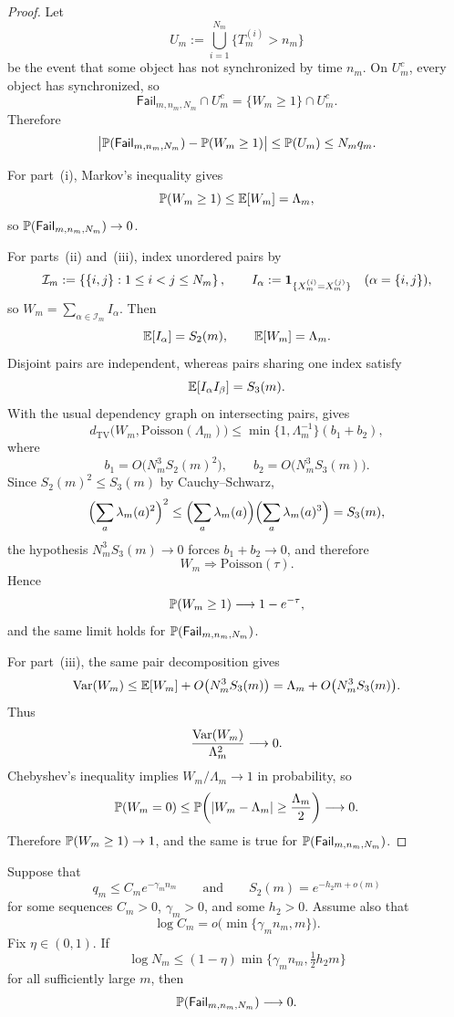 \begin{proof}
Let
\[
  U_m:=\bigcup_{i=1}^{N_m}\{T_m^{(i)}>n_m\}
\]
be the event that some object has not synchronized by time \(n_m\).
On \(U_m^c\), every object has synchronized, so
\[
  \mathsf{Fail}_{m,n_m,N_m}\cap U_m^c
  = \{W_m\geq 1\}\cap U_m^c.
\]
Therefore
\[
  \bigl|
    \mathbb{P}(\mathsf{Fail}_{m,n_m,N_m})
    - \mathbb{P}(W_m\geq 1)
  \bigr|
  \leq \mathbb{P}(U_m)
  \leq N_m q_m.
\]

For part~(i), Markov's inequality gives
\[
  \mathbb{P}(W_m\geq 1)\leq \mathbb{E}[W_m]=\Lambda_m,
\]
so \(\mathbb{P}(\mathsf{Fail}_{m,n_m,N_m})\to 0\).

For parts~(ii) and~(iii), index unordered pairs by
\[
  \mathcal{I}_m:=\left\{\{i,j\}:1\leq i<j\leq N_m\right\},
  \qquad
  I_\alpha:=\mathbf{1}_{\{X_m^{(i)}=X_m^{(j)}\}}
  \quad (\alpha=\{i,j\}),
\]
so \(W_m=\sum_{\alpha\in\mathcal{I}_m}I_\alpha\).  Then
\[
  \mathbb{E}[I_\alpha]=S_2(m),
  \qquad
  \mathbb{E}[W_m]=\Lambda_m.
\]
Disjoint pairs are independent, whereas pairs sharing one index satisfy
\[
  \mathbb{E}[I_\alpha I_\beta]=S_3(m).
\]
With the usual dependency graph on intersecting pairs,
\citet[Theorem~1]{ArratiaGoldsteinGordon1989} gives
\[
  d_{\mathrm{TV}}
   \bigl(W_m,\mathrm{Poisson}(\Lambda_m)\bigr)
  \leq \min\{1,\Lambda_m^{-1}\}(b_1+b_2),
\]
where
\[
  b_1=O\bigl(N_m^3S_2(m)^2\bigr),
  \qquad
  b_2=O\bigl(N_m^3S_3(m)\bigr).
\]
Since \(S_2(m)^2\leq S_3(m)\) by Cauchy--Schwarz,
\[
  \Bigl(\sum_a\lambda_m(a)^2\Bigr)^2
  \leq \Bigl(\sum_a\lambda_m(a)\Bigr)
      \Bigl(\sum_a\lambda_m(a)^3\Bigr)
  = S_3(m),
\]
the hypothesis \(N_m^3S_3(m)\to 0\) forces \(b_1+b_2\to 0\), and
therefore
\[
  W_m \Rightarrow \mathrm{Poisson}(\tau).
\]
Hence
\[
  \mathbb{P}(W_m\geq 1)\longrightarrow 1-e^{-\tau},
\]
and the same limit holds for \(\mathbb{P}(\mathsf{Fail}_{m,n_m,N_m})\).

For part~(iii), the same pair decomposition gives
\[
  \operatorname{Var}(W_m)
  \leq \mathbb{E}[W_m] + O\bigl(N_m^3S_3(m)\bigr)
  = \Lambda_m + O\bigl(N_m^3S_3(m)\bigr).
\]
Thus
\[
  \frac{\operatorname{Var}(W_m)}{\Lambda_m^2}\longrightarrow 0.
\]
Chebyshev's inequality implies \(W_m/\Lambda_m\to 1\) in probability, so
\[
  \mathbb{P}(W_m=0)\leq
  \mathbb{P}\!\left(\lvert W_m-\Lambda_m\rvert\geq \frac{\Lambda_m}{2}\right)
  \longrightarrow 0.
\]
Therefore \(\mathbb{P}(W_m\geq 1)\to 1\), and the same is true for
\(\mathbb{P}(\mathsf{Fail}_{m,n_m,N_m})\).
\end{proof}

\begin{corollary}
\label{cor:capacity-region}
Suppose that
\[
  q_m\leq C_m e^{-\gamma_m n_m}
  \qquad\text{and}\qquad
  S_2(m)=e^{-h_2m+o(m)}
\]
for some sequences \(C_m>0\), \(\gamma_m>0\), and some \(h_2>0\).
Assume also that
\[
  \log C_m=o\bigl(\min\{\gamma_m n_m,m\}\bigr).
\]
Fix \(\eta\in(0,1)\).  If
\[
  \log N_m
  \leq (1-\eta)\min\bigl\{\gamma_m n_m,\tfrac12 h_2m\bigr\}
\]
for all sufficiently large \(m\), then
\[
  \mathbb{P}(\mathsf{Fail}_{m,n_m,N_m})\longrightarrow 0.
\]
\end{corollary}

